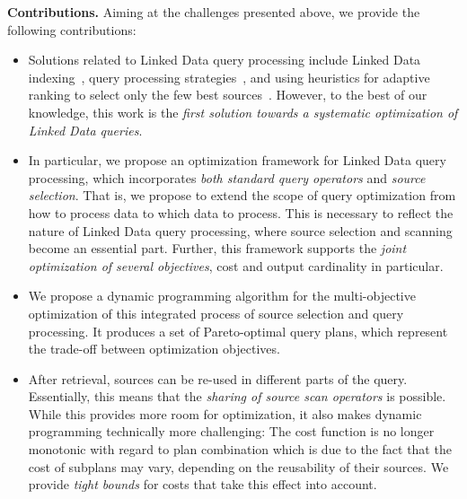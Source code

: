 \textbf{Contributions.} Aiming at the challenges presented above, we
provide the following contributions:


\begin{itemize}
\item Solutions related to Linked Data query processing include Linked
  Data indexing~\cite{harth_data_2010}, query processing
  strategies~\cite{hartig_executing_2009,ladwig_linked_2010}, and
  using heuristics for adaptive ranking to select only the few best
  sources~\cite{ladwig_linked_2010}. However, to the best of our
  knowledge, this work is the \emph{first solution towards a
    systematic optimization of Linked Data queries}.

\item In particular, we propose an optimization framework  for Linked
  Data query processing, which incorporates \emph{both standard query
    operators} and \emph{source selection}. That is, we propose to
  extend the scope of query optimization from how to process data to
  which data to process. This is necessary to reflect the nature of
  Linked Data query processing, where source selection and scanning
  become an essential part. Further, this framework supports the
  \emph{joint optimization of several objectives}, cost and output
  cardinality in particular.

\item We propose a dynamic programming algorithm for the
  multi-objective optimization of this integrated process of source
  selection and query processing. It produces a set of Pareto-optimal
  query plans, which represent the trade-off between optimization
  objectives.
  
\item After retrieval, sources can be re-used in different parts of
  the query. Essentially, this means that the \emph{sharing of source
    scan operators} is possible. While this provides more room for
  optimization, it also makes dynamic programming technically more
  challenging: The cost function is no longer monotonic with regard to
  plan combination which is due to the fact that the cost of subplans
  may vary, depending on the reusability of their sources. We provide
  \emph{tight bounds} for costs that take this effect into account.
\end{itemize}




